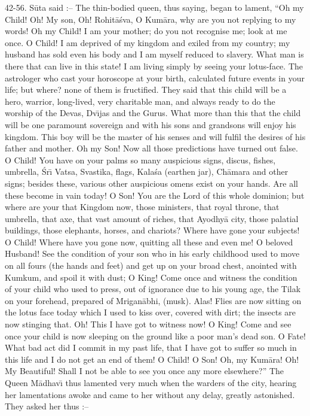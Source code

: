 42-56. S\=uta said :-- The thin-bodied queen, thus saying, began to lament, ``Oh my Child! Oh! My son, Oh! Rohit\=a\'sva, O Kum\=ara, why are you not replying to my words! Oh my Child! I am your mother; do you not recognise me; look at me once. O Child! I am deprived of my kingdom and exiled from my country; my husband has sold even his body and I am myself reduced to slavery. What man is there that can live in this state! I am living simply by seeing your lotus-face. The astrologer who cast your horoscope at your birth, calculated future events in your life; but where? none of them is fructified. They said that this child will be a hero, warrior, long-lived, very charitable man, and always ready to do the worship of the Devas, Dv\={\i}jas and the Gurus. What more than this that the child will be one paramount sovereign and with his sons and grandsons will enjoy his kingdom. This boy will be the master of his senses and will fulfil the desires of his father and mother. Oh my Son! Now all those predictions have turned out false. O Child! You have on your palms so many auspicious signs, discus, fishes, umbrella, \'Sr\={\i} Vatsa, Svastika, flags, Kala\'sa (earthen jar), Ch\=amara and other signs; besides these, various other auspicious omens exist on your hands. Are all these become in vain today! O Son! You are the Lord of this whole dominion; but where are your that Kingdom now, those ministers, that royal throne, that umbrella, that axe, that vast amount of riches, that Ayodhy\=a city, those palatial buildings, those elephants, horses, and chariots? Where have gone your subjects! O Child! Where have you gone now, quitting all these and even me! O beloved Husband! See the condition of your son who in his early childhood used to move on all fours (the hands and feet) and get up on your broad chest, anointed with Kumkum, and spoil it with dust; O King! Come once and witness the condition of your child who used to press, out of ignorance due to his young age, the Tilak on your forehead, prepared of Mrigan\=abhi, (musk). Alas! Flies are now sitting on the lotus face today which I used to kiss over, covered with dirt; the insects are now stinging that. Oh! This I have got to witness now! O King! Come and see once your child is now sleeping on the ground like a poor man's dead son. O Fate! What bad act did I commit in my past life, that I have got to suffer so much in this life and I do not get an end of them! O Child! O Son! Oh, my Kum\=ara! Oh! My Beautiful! Shall I not be able to see you once any more elsewhere?'' The Queen M\=adhav\={\i} thus lamented very much when the warders of the city, hearing her lamentations awoke and came to her without any delay, greatly astonished. They asked her thus :--

